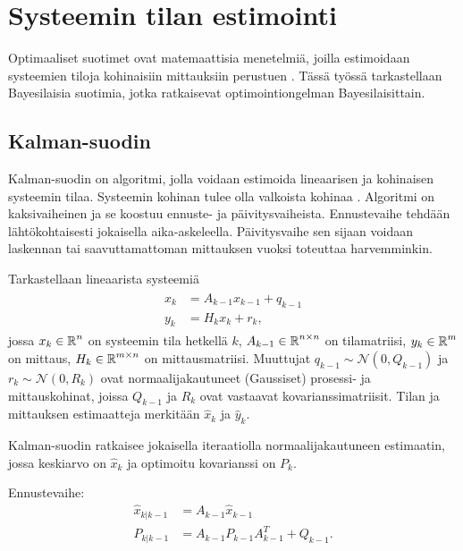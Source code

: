 \chapter{Systeemin tilan estimointi }%
\label{ch:estimointi}
Optimaaliset suotimet ovat  matemaattisia menetelmiä, joilla estimoidaan systeemien tiloja kohinaisiin mittauksiin perustuen \cite{sarkka_bayesian}. Tässä työssä tarkastellaan Bayesilaisia suotimia, jotka ratkaisevat optimointiongelman Bayesilaisittain. 


\section{Kalman-suodin}

Kalman-suodin on algoritmi, jolla voidaan estimoida lineaarisen ja kohinaisen systeemin tilaa. Systeemin kohinan tulee olla valkoista kohinaa \cite[s. 56]{sarkka_bayesian}. Algoritmi on kaksivaiheinen ja se koostuu ennuste- ja päivitysvaiheista. 
Ennustevaihe tehdään lähtökohtaisesti jokaisella aika-askeleella. Päivitysvaihe sen sijaan voidaan laskennan tai saavuttamattoman mittauksen vuoksi toteuttaa harvemminkin. 

Tarkastellaan lineaarista systeemiä
\begin{align}
    \begin{split}
        x_k &= A_{k-1}x_{k-1} + q_{k-1} \\
        y_k &= H_k x_k + r_k,
    \end{split}
\end{align}
jossa \(x_k \in \operatorname{\mathbb{R}}^n \) on systeemin tila hetkellä \(k\), \(A_{k-1}\in \operatorname{\mathbb{R}}^{n\times n}\) on tilamatriisi, \(y_k\in \operatorname{\mathbb{R}}^m\) on mittaus, \(H_k \in \operatorname{\mathbb{R}}^{m \times n}\) on mittausmatriisi. Muuttujat \(q_{k-1} \sim \mathcal{N}(0, Q_{k-1})\) ja \(r_k \sim \mathcal{N}(0, R_k)\) ovat normaalijakautuneet (Gaussiset) prosessi- ja mittauskohinat, joissa \(Q_{k-1}\) ja \(R_k\) ovat vastaavat kovarianssimatriisit. Tilan ja mittauksen estimaatteja merkitään \(\hat{x}_k\) ja \(\hat{y}_k\).

Kalman-suodin ratkaisee jokaisella iteraatiolla normaalijakautuneen estimaatin, jossa keskiarvo on \(\hat{x}_k\) ja optimoitu kovarianssi on \(P_k\).  

Ennustevaihe:
\begin{align}
    \hat{x}_{k | k-1}  &= A_{k-1} \hat{x}_{k-1}\\
    P_{k | k-1} &= A_{k-1} P_{k-1} A_{k-1}^T + Q_{k-1}.
\end{align}

